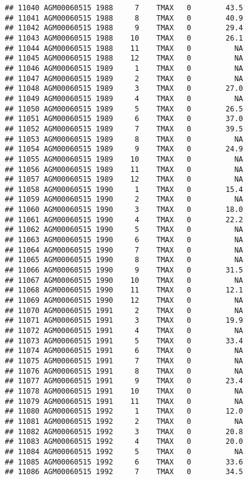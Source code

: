 \documentclass{article}\usepackage[]{graphicx}\usepackage[]{color}
\makeatletter
\newenvironment{kframe}{%
 \def\at@end@of@kframe{}%
 \ifinner\ifhmode%
  \def\at@end@of@kframe{\end{minipage}}%
  \begin{minipage}{\columnwidth}%
 \fi\fi%
 \def\FrameCommand##1{\hskip\@totalleftmargin \hskip-\fboxsep
 \colorbox{shadecolor}{##1}\hskip-\fboxsep
     \hskip-\linewidth \hskip-\@totalleftmargin \hskip\columnwidth}%
 \MakeFramed {\advance\hsize-\width
   \@totalleftmargin\z@ \linewidth\hsize
   \@setminipage}}%
 {\par\unskip\endMakeFramed%
 \at@end@of@kframe}
\newenvironment{knitrout}{}{} %
\makeatother
\begin{document}
\begin{knitrout}
\begin{kframe}
\begin{verbatim}
## 11040 AGM00060515 1988     7    TMAX   0        43.5
## 11041 AGM00060515 1988     8    TMAX   0        40.9
## 11042 AGM00060515 1988     9    TMAX   0        29.4
## 11043 AGM00060515 1988    10    TMAX   0        26.1
## 11044 AGM00060515 1988    11    TMAX   0          NA
## 11045 AGM00060515 1988    12    TMAX   0          NA
## 11046 AGM00060515 1989     1    TMAX   0          NA
## 11047 AGM00060515 1989     2    TMAX   0          NA
## 11048 AGM00060515 1989     3    TMAX   0        27.0
## 11049 AGM00060515 1989     4    TMAX   0          NA
## 11050 AGM00060515 1989     5    TMAX   0        26.5
## 11051 AGM00060515 1989     6    TMAX   0        37.0
## 11052 AGM00060515 1989     7    TMAX   0        39.5
## 11053 AGM00060515 1989     8    TMAX   0          NA
## 11054 AGM00060515 1989     9    TMAX   0        24.9
## 11055 AGM00060515 1989    10    TMAX   0          NA
## 11056 AGM00060515 1989    11    TMAX   0          NA
## 11057 AGM00060515 1989    12    TMAX   0          NA
## 11058 AGM00060515 1990     1    TMAX   0        15.4
## 11059 AGM00060515 1990     2    TMAX   0          NA
## 11060 AGM00060515 1990     3    TMAX   0        18.0
## 11061 AGM00060515 1990     4    TMAX   0        22.2
## 11062 AGM00060515 1990     5    TMAX   0          NA
## 11063 AGM00060515 1990     6    TMAX   0          NA
## 11064 AGM00060515 1990     7    TMAX   0          NA
## 11065 AGM00060515 1990     8    TMAX   0          NA
## 11066 AGM00060515 1990     9    TMAX   0        31.5
## 11067 AGM00060515 1990    10    TMAX   0          NA
## 11068 AGM00060515 1990    11    TMAX   0        12.1
## 11069 AGM00060515 1990    12    TMAX   0          NA
## 11070 AGM00060515 1991     2    TMAX   0          NA
## 11071 AGM00060515 1991     3    TMAX   0        19.9
## 11072 AGM00060515 1991     4    TMAX   0          NA
## 11073 AGM00060515 1991     5    TMAX   0        33.4
## 11074 AGM00060515 1991     6    TMAX   0          NA
## 11075 AGM00060515 1991     7    TMAX   0          NA
## 11076 AGM00060515 1991     8    TMAX   0          NA
## 11077 AGM00060515 1991     9    TMAX   0        23.4
## 11078 AGM00060515 1991    10    TMAX   0          NA
## 11079 AGM00060515 1991    11    TMAX   0          NA
## 11080 AGM00060515 1992     1    TMAX   0        12.0
## 11081 AGM00060515 1992     2    TMAX   0          NA
## 11082 AGM00060515 1992     3    TMAX   0        20.8
## 11083 AGM00060515 1992     4    TMAX   0        20.0
## 11084 AGM00060515 1992     5    TMAX   0          NA
## 11085 AGM00060515 1992     6    TMAX   0        33.6
## 11086 AGM00060515 1992     7    TMAX   0        34.5

\end{verbatim}
\end{kframe}
\end{knitrout}
\end{document}

